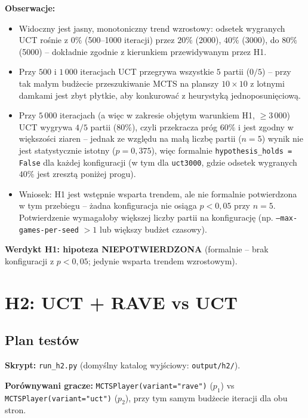 \documentclass[11pt,a4paper]{article}
\begin{document}
\textbf{Obserwacje:}
\begin{itemize}
    \item Widoczny jest jasny, monotoniczny trend wzrostowy: odsetek
        wygranych UCT rośnie z $0\%$ (500--1000 iteracji) przez $20\%$
        (2000), $40\%$ (3000), do $80\%$ (5000) -- dokładnie zgodnie z
        kierunkiem przewidywanym przez H1.
    \item Przy $500$ i $1\,000$ iteracjach UCT przegrywa wszystkie
        $5$ partii ($0/5$) -- przy tak małym budżecie przeszukiwanie MCTS
        na planszy $10\times10$ z lotnymi damkami jest zbyt płytkie, aby
        konkurować z heurystyką jednoposunięciową.
    \item Przy $5\,000$ iteracjach (a więc w zakresie objętym warunkiem H1,
        $\geq 3\,000$) UCT wygrywa $4/5$ partii ($80\%$), czyli
        przekracza próg $60\%$ i jest zgodny w większości ziaren --
        jednak ze względu na małą liczbę partii ($n=5$) wynik nie jest
        statystycznie istotny ($p=0{,}375$), więc formalnie
        \texttt{hypothesis\_holds = False} dla każdej konfiguracji
        (w tym dla \texttt{uct3000}, gdzie odsetek wygranych $40\%$ jest
        zresztą poniżej progu).
    \item Wniosek: H1 jest wstępnie wsparta trendem, ale nie
        formalnie potwierdzona w tym przebiegu -- żadna konfiguracja nie
        osiąga $p < 0{,}05$ przy $n=5$. Potwierdzenie wymagałoby większej
        liczby partii na konfigurację (np. \texttt{--max-games-per-seed}
        $> 1$ lub większy budżet czasowy).
\end{itemize}

\medskip
\noindent\textbf{Werdykt H1: hipoteza NIEPOTWIERDZONA} (formalnie --
brak konfiguracji z $p<0{,}05$; jedynie wsparta trendem wzrostowym).


\section{H2: UCT + RAVE vs UCT}
\label{sec:h2}

\subsection{Plan testów}

\textbf{Skrypt:} \texttt{run\_h2.py} (domyślny katalog wyjściowy:
\texttt{output/h2/}).

\textbf{Porównywani gracze:} \texttt{MCTSPlayer(variant="rave")} ($p_1$)
vs \texttt{MCTSPlayer(variant="uct")} ($p_2$), przy tym samym
budżecie iteracji dla obu stron.
\end{document}
